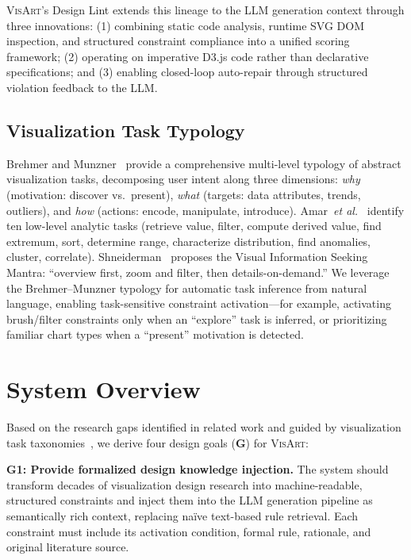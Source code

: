 \documentclass[final,5p,times,twocolumn]{elsarticle}
\newcommand{\sysname}{\textsc{VisArt}}
\newcommand{\etal}{\textit{et al.}}
\begin{document}
\sysname{}'s Design Lint extends this lineage to the LLM generation context through three innovations: (1) combining static code analysis, runtime SVG DOM inspection, and structured constraint compliance into a unified scoring framework; (2) operating on imperative D3.js code rather than declarative specifications; and (3) enabling closed-loop auto-repair through structured violation feedback to the LLM.

\subsection{Visualization Task Typology}

Brehmer and Munzner~\cite{brehmer2013multi} provide a comprehensive multi-level typology of abstract visualization tasks, decomposing user intent along three dimensions: \textit{why} (motivation: discover vs.\ present), \textit{what} (targets: data attributes, trends, outliers), and \textit{how} (actions: encode, manipulate, introduce). Amar~\etal{}~\cite{amar2005low} identify ten low-level analytic tasks (retrieve value, filter, compute derived value, find extremum, sort, determine range, characterize distribution, find anomalies, cluster, correlate). Shneiderman~\cite{shneiderman1996eyes} proposes the Visual Information Seeking Mantra: ``overview first, zoom and filter, then details-on-demand.'' We leverage the Brehmer--Munzner typology for automatic task inference from natural language, enabling task-sensitive constraint activation---for example, activating brush/filter constraints only when an ``explore'' task is inferred, or prioritizing familiar chart types when a ``present'' motivation is detected.


\section{System Overview}
\label{sec:overview}

Based on the research gaps identified in related work and guided by visualization task taxonomies~\cite{brehmer2013multi,amar2005low}, we derive four design goals (\textbf{G}) for \sysname{}:

\textbf{G1: Provide formalized design knowledge injection.} The system should transform decades of visualization design research into machine-readable, structured constraints and inject them into the LLM generation pipeline as semantically rich context, replacing na\"ive text-based rule retrieval. Each constraint must include its activation condition, formal rule, rationale, and original literature source.
\end{document}
